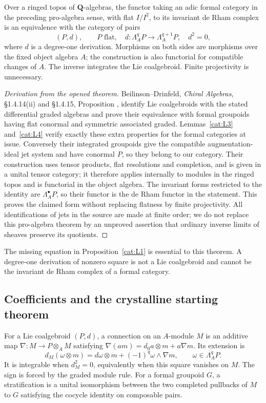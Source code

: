 \begin{theorem}\label{cat:L5}
Over a ringed topos of $\mathbf Q$-algebras, the functor taking an adic
formal category in the preceding pro-algebra sense, with flat $I/I^2$,
to its invariant de Rham complex is
an equivalence with the category of pairs
\[
 (P,d),\qquad P\text{ flat},\quad
 d:\Lambda_A^qP\longrightarrow\Lambda_A^{q+1}P,
 \quad d^2=0,
\]
where $d$ is a degree-one derivation.  Morphisms on both sides are
morphisms over the fixed object algebra $A$; the construction is also
functorial for compatible changes of $A$.  The inverse integrates the
Lie coalgebroid.  Finite projectivity is unnecessary.
\end{theorem}
\begin{proof}[Derivation from the opened theorem]
Beilinson--Drinfeld, \emph{Chiral Algebras},
\S1.4.14(ii) and \S1.4.15, Proposition
\cite{catBeilinsonDrinfeld2004}, identify Lie coalgebroids with the
stated differential graded algebras and prove their equivalence with
formal groupoids having flat conormal and symmetric associated graded.
Lemmas~\ref{cat:L3} and~\ref{cat:L4} verify exactly these extra
properties for the formal categories at issue.  Conversely their
integrated groupoids give the compatible augmentation-ideal jet system
and have conormal $P$, so they belong to our category.  Their construction uses
tensor products, flat resolutions and completion, and is given in a
unital tensor category; it therefore applies internally to modules in
the ringed topos and is functorial in the object algebra.  The invariant
forms restricted to the identity are $\Lambda_A^\bullet P$, so their
functor is the de Rham functor in the statement.  This proves the
claimed form without replacing flatness by finite projectivity.
All identifications of jets in the source are made at finite order;
we do not replace this pro-algebra theorem by an unproved assertion
that ordinary inverse limits of sheaves preserve its quotients.
\end{proof}

The missing equation in Proposition~\ref{cat:L1} is essential to this
theorem.  A degree-one derivation of nonzero square is not a Lie
coalgebroid and cannot be the invariant de Rham complex of a formal
category.

\subsection{Coefficients and the crystalline starting theorem}
For a Lie coalgebroid $(P,d)$, a connection on an $A$-module $M$ is an
additive map $\nabla:M\to P\otimes_A M$ satisfying
$\nabla(am)=d_0a\otimes m+a\nabla m$.  Its extension is
\[
 d_M(\omega\otimes m)=d\omega\otimes m+
          (-1)^q\omega\wedge\nabla m,
 \qquad\omega\in\Lambda_A^qP.
\]
It is integrable when $d_M^2=0$, equivalently when this square vanishes
on $M$.  The sign is forced by the graded module rule.
For a formal groupoid $G$, a stratification is a unital isomorphism
between the two completed pullbacks of $M$ to $G$ satisfying the cocycle
identity on composable pairs.

